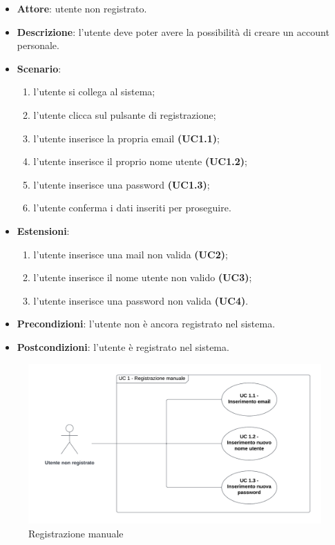 \begin{itemize}
    \item \textbf{Attore}: utente non registrato.
    \item \textbf{Descrizione}: l'utente deve poter avere la possibilità di creare un account personale.
    \item \textbf{Scenario}:
    \begin{enumerate}
        \item l'utente si collega al sistema;
        \item l'utente clicca sul pulsante di registrazione;
        \item l'utente inserisce la propria email \textbf{(UC1.1)};
        \item l'utente inserisce il proprio nome utente \textbf{(UC1.2)};
        \item l'utente inserisce una password \textbf{(UC1.3)};
        \item l'utente conferma i dati inseriti per proseguire.
    \end{enumerate}
    \item \textbf{Estensioni}: 
        \begin{enumerate}
            \item l'utente inserisce una mail non valida  \textbf{(UC2)};
            \item l'utente inserisce il nome utente non valido \textbf{(UC3)};
            \item l'utente inserisce una password non valida \textbf{(UC4)}.
        \end{enumerate}

    \item \textbf{Precondizioni}: l'utente non è ancora registrato nel sistema.
    \item \textbf{Postcondizioni}: l'utente è registrato nel sistema.
\end{itemize}

\begin{figure}[!h]
    \includegraphics[width=15cm]{sezioni/Images/UC1_s.png}
    \centering
    \caption{Registrazione manuale}
\end{figure}

